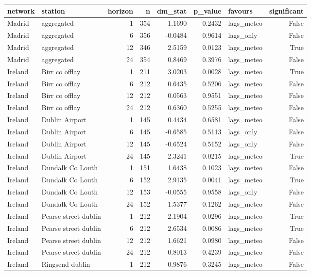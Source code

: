 \begin{tabular}{llrrrrlr}
\toprule
network & station & horizon & n & dm\_stat & p\_value & favours & significant \\
\midrule
Madrid & aggregated & 1 & 354 & 1.1690 & 0.2432 & lags\_meteo & False \\
Madrid & aggregated & 6 & 356 & -0.0484 & 0.9614 & lags\_only & False \\
Madrid & aggregated & 12 & 346 & 2.5159 & 0.0123 & lags\_meteo & True \\
Madrid & aggregated & 24 & 354 & 0.8469 & 0.3976 & lags\_meteo & False \\
Ireland & Birr co offlay & 1 & 211 & 3.0203 & 0.0028 & lags\_meteo & True \\
Ireland & Birr co offlay & 6 & 212 & 0.6435 & 0.5206 & lags\_meteo & False \\
Ireland & Birr co offlay & 12 & 212 & 0.0563 & 0.9551 & lags\_meteo & False \\
Ireland & Birr co offlay & 24 & 212 & 0.6360 & 0.5255 & lags\_meteo & False \\
Ireland & Dublin Airport & 1 & 145 & 0.4434 & 0.6581 & lags\_meteo & False \\
Ireland & Dublin Airport & 6 & 145 & -0.6585 & 0.5113 & lags\_only & False \\
Ireland & Dublin Airport & 12 & 145 & -0.6524 & 0.5152 & lags\_only & False \\
Ireland & Dublin Airport & 24 & 145 & 2.3241 & 0.0215 & lags\_meteo & True \\
Ireland & Dundalk Co Louth & 1 & 151 & 1.6438 & 0.1023 & lags\_meteo & False \\
Ireland & Dundalk Co Louth & 6 & 152 & 2.9135 & 0.0041 & lags\_meteo & True \\
Ireland & Dundalk Co Louth & 12 & 153 & -0.0555 & 0.9558 & lags\_only & False \\
Ireland & Dundalk Co Louth & 24 & 152 & 1.5377 & 0.1262 & lags\_meteo & False \\
Ireland & Pearse street dublin & 1 & 212 & 2.1904 & 0.0296 & lags\_meteo & True \\
Ireland & Pearse street dublin & 6 & 212 & 2.6534 & 0.0086 & lags\_meteo & True \\
Ireland & Pearse street dublin & 12 & 212 & 1.6621 & 0.0980 & lags\_meteo & False \\
Ireland & Pearse street dublin & 24 & 212 & 0.8013 & 0.4239 & lags\_meteo & False \\
Ireland & Ringsend dublin & 1 & 212 & 0.9876 & 0.3245 & lags\_meteo & False \\

\end{tabular}
